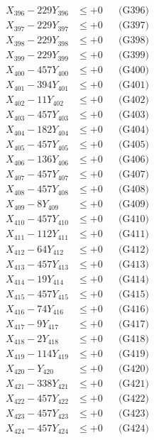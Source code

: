 \documentclass[a4paper,10pt]{article}
\begin{document}
{\begin{align}
X_{396} - 229Y_{396} &\leq +0 && \text{(G396)} \\
X_{397} - 229Y_{397} &\leq +0 && \text{(G397)} \\
X_{398} - 229Y_{398} &\leq +0 && \text{(G398)} \\
X_{399} - 229Y_{399} &\leq +0 && \text{(G399)} \\
X_{400} - 457Y_{400} &\leq +0 && \text{(G400)} \\
\allowbreak
X_{401} - 394Y_{401} &\leq +0 && \text{(G401)} \\
X_{402} - 11Y_{402} &\leq +0 && \text{(G402)} \\
X_{403} - 457Y_{403} &\leq +0 && \text{(G403)} \\
X_{404} - 182Y_{404} &\leq +0 && \text{(G404)} \\
X_{405} - 457Y_{405} &\leq +0 && \text{(G405)} \\
X_{406} - 136Y_{406} &\leq +0 && \text{(G406)} \\
X_{407} - 457Y_{407} &\leq +0 && \text{(G407)} \\
X_{408} - 457Y_{408} &\leq +0 && \text{(G408)} \\
X_{409} - 8Y_{409} &\leq +0 && \text{(G409)} \\
X_{410} - 457Y_{410} &\leq +0 && \text{(G410)} \\
\allowbreak
X_{411} - 112Y_{411} &\leq +0 && \text{(G411)} \\
X_{412} - 64Y_{412} &\leq +0 && \text{(G412)} \\
X_{413} - 457Y_{413} &\leq +0 && \text{(G413)} \\
X_{414} - 19Y_{414} &\leq +0 && \text{(G414)} \\
X_{415} - 457Y_{415} &\leq +0 && \text{(G415)} \\
X_{416} - 74Y_{416} &\leq +0 && \text{(G416)} \\
X_{417} - 9Y_{417} &\leq +0 && \text{(G417)} \\
X_{418} - 2Y_{418} &\leq +0 && \text{(G418)} \\
X_{419} - 114Y_{419} &\leq +0 && \text{(G419)} \\
X_{420} - Y_{420} &\leq +0 && \text{(G420)} \\
\allowbreak
X_{421} - 338Y_{421} &\leq +0 && \text{(G421)} \\
X_{422} - 457Y_{422} &\leq +0 && \text{(G422)} \\
X_{423} - 457Y_{423} &\leq +0 && \text{(G423)} \\
X_{424} - 457Y_{424} &\leq +0 && \text{(G424)} \\

\end{align}}
\end{document}
